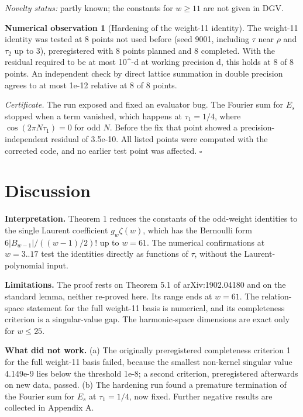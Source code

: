 \documentclass[10pt,twocolumn]{article}
\theoremstyle{definition}\newtheorem{definition}{Definition}\newtheorem{example}{Example}
\newtheorem{observation}{Numerical observation}\theoremstyle{remark}\newtheorem{remark}{Remark}
\begin{document}
\emph{Novelty status:} partly known; the constants for \(w\ge 11\) are not given in DGV.

\begin{observation}[Hardening of the weight-11 identity]
The weight-11 identity was tested at 8 points not used before (seed 9001, including \(\tau\) near \(\rho\) and \(\tau_2\) up to 3), preregistered with 8 points planned and 8 completed. With the residual required to be at most 10\^{}-d at working precision d, this holds at 8 of 8 points. An independent check by direct lattice summation in double precision agrees to at most 1e-12 relative at 8 of 8 points.
\end{observation}

\emph{Certificate.} The run exposed and fixed an evaluator bug. The Fourier sum for \(E_s\) stopped when a term vanished, which happens at \(\tau_1=1/4\), where \(\cos(2\pi N\tau_1)=0\) for odd \(N\). Before the fix that point showed a precision-independent residual of 3.5e-10. All listed points were computed with the corrected code, and no earlier test point was affected. \(\square\)

\section{Discussion}\label{discussion}

\textbf{Interpretation.} Theorem 1 reduces the constants of the odd-weight identities to the single Laurent coefficient \(g_w\zeta(w)\), which has the Bernoulli form \(6|B_{w-1}|/((w-1)/2)!\) up to \(w=61\). The numerical confirmations at \(w=3..17\) test the identities directly as functions of \(\tau\), without the Laurent-polynomial input.

\textbf{Limitations.} The proof rests on Theorem 5.1 of arXiv:1902.04180 and on the standard lemma, neither re-proved here. Its range ends at \(w=61\). The relation-space statement for the full weight-11 basis is numerical, and its completeness criterion is a singular-value gap. The harmonic-space dimensions are exact only for \(w\le 25\).

\textbf{What did not work.} (a) The originally preregistered completeness criterion 1 for the full weight-11 basis failed, because the smallest non-kernel singular value 4.149e-9 lies below the threshold 1e-8; a second criterion, preregistered afterwards on new data, passed. (b) The hardening run found a premature termination of the Fourier sum for \(E_s\) at \(\tau_1=1/4\), now fixed. Further negative results are collected in Appendix A.
\end{document}
